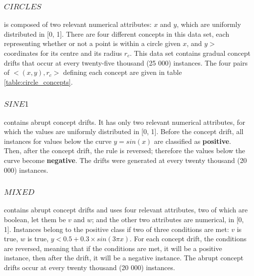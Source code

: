 \documentclass[runningheads]{llncs}
\begin{document}
\subsubsection{$CIRCLES$}
 is composed of two relevant numerical attributes: $x$ and $y$, which are uniformly distributed in [0, 1]. There are four different concepts in this data set, each representing whether or not a point is within a circle given $x$, and $y>$ coordinates for its centre and its radius $r_c$. This data set contains gradual concept drifts that occur at every twenty-five thousand (25 000) instances. The four pairs of $<(x,y), r_c>$ defining each concept are given in table \ref{table:circle_concepts}.


\subsubsection{$SINE1$}
contains abrupt concept drifts. It has only two relevant numerical attributes, for which the values are uniformly distributed in [0, 1]. Before the concept drift, all instances for values below the curve $y = sin(x)$ are classified as \textbf{positive}. Then, after the concept drift, the rule is reversed; therefore the values below the curve become \textbf{negative}. The drifts were generated at every twenty thousand (20 000) instances.

\subsubsection{$MIXED$}
contains abrupt concept drifts and uses four relevant attributes, two of which are boolean, let them be $v$ and $w$; and the other two attributes are numerical, in [0, 1]. Instances belong to the positive class if two of three conditions are met: $v$ is true, $w$ is true, $y < 0.5 + 0.3 \times sin(3\pi x)$. For each concept drift, the conditions are reversed, meaning that if the conditions are met, it will be a positive instance, then after the drift, it will be a negative instance. The abrupt concept drifts occur at every twenty thousand (20 000) instances.
\end{document}
